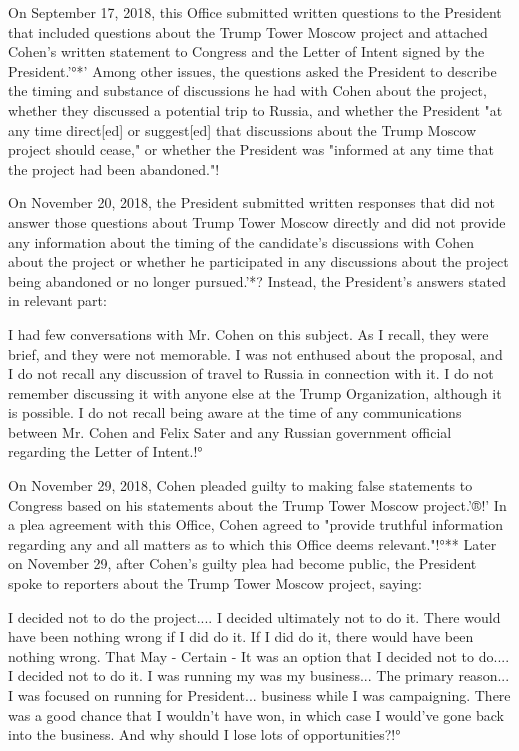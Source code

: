 On September 17, 2018, this Office submitted written questions to the President that included questions about the Trump Tower Moscow project and attached Cohen's written statement to Congress and the Letter of Intent signed by the President.'°*'
Among other issues, the questions asked the President to describe the timing and substance of discussions he had with Cohen about the project, whether they discussed a potential trip to Russia, and whether the President "at any time direct[ed] or suggest[ed] that discussions about the Trump Moscow project should cease," or whether the President was "informed at any time that the project had been abandoned."!%

On November 20, 2018, the President submitted written responses that did not answer those questions about Trump Tower Moscow directly and did not provide any information about the timing of the candidate's discussions with Cohen about the project or whether he participated in any discussions about the project being abandoned or no longer pursued.'*?
Instead, the President's answers stated in relevant part:

I had few conversations with Mr. Cohen on this subject.
As I recall, they were brief, and they were not memorable.
I was not enthused about the proposal, and I do not recall any discussion of travel to Russia in connection with it.
I do not remember discussing it with anyone else at the Trump Organization, although it is possible.
I do not recall being aware at the time of any communications between Mr. Cohen and Felix Sater and any Russian government official regarding the Letter of Intent.!°

On November 29, 2018, Cohen pleaded guilty to making false statements to Congress based on his statements about the Trump Tower Moscow project.'®!'
In a plea agreement with this Office, Cohen agreed to "provide truthful information regarding any and all matters as to which this Office deems relevant."!°**
Later on November 29, after Cohen's guilty plea had become public, the President spoke to reporters about the Trump Tower Moscow project, saying:

I decided not to do the project....
I decided ultimately not to do it.
There would have been nothing wrong if I did do it.
If I did do it, there would have been nothing wrong.
That
May - Certain -
It was an option that I decided not to do....
I decided not to do it.
I was running my
was my business...
The primary reason...
I was focused on running for President...
business while I was campaigning.
There was a good chance that I wouldn't have won, in which case I would've gone back into the business.
And why should I lose lots of opportunities?!°

